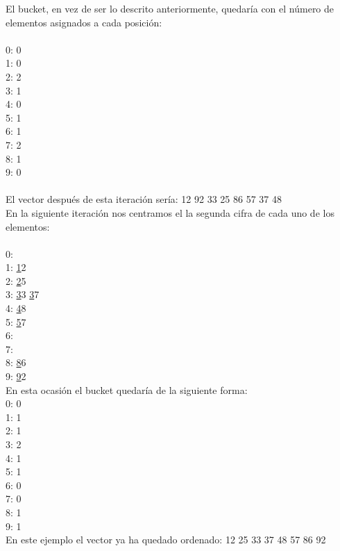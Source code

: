 El bucket, en vez de ser lo descrito anteriormente, quedaría con el número de elementos asignados a cada posición:\\
\\
0: 0\\
1: 0\\
2: 2\\
3: 1\\
4: 0\\
5: 1\\
6: 1\\
7: 2\\
8: 1\\
9: 0\\
\\

El vector después de esta iteración sería: 12 92 33 25 86 57 37 48\\

En la siguiente iteración nos centramos el la segunda cifra de cada uno de los elementos:\\
\\
0:\\
1: \underline{1}2\\
2: \underline{2}5\\
3: \underline{3}3 \underline{3}7\\
4: \underline{4}8\\
5: \underline{5}7\\
6: \\
7: \\
8: \underline{8}6\\
9: \underline{9}2\\

En esta ocasión el bucket quedaría de la siguiente forma:
\\
0: 0\\
1: 1\\
2: 1\\
3: 2\\
4: 1\\
5: 1\\
6: 0\\
7: 0\\
8: 1\\
9: 1\\

En este ejemplo el vector ya ha quedado ordenado: 12 25 33 37 48 57 86 92\\
